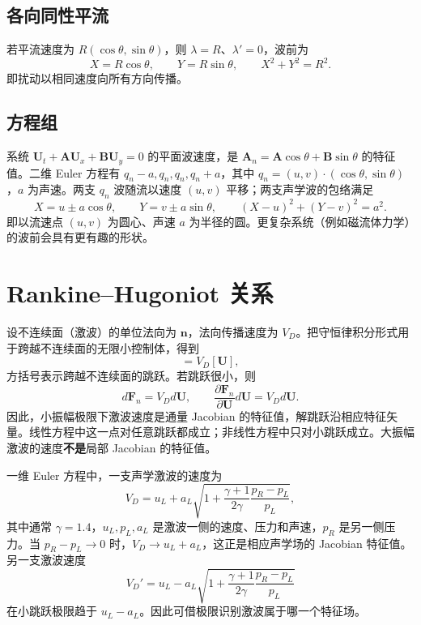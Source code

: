 \documentclass[11pt,a4paper,openany,fontset=none]{ctexbook}
\begin{document}
\subsection*{各向同性平流}
若平流速度为 $R(\cos\theta,\sin\theta)$，则 $\lambda=R$、$\lambda'=0$，波前为
\begin{equation}X=R\cos\theta,\qquad Y=R\sin\theta,\qquad X^2+Y^2=R^2. \tag{1.21.7--8}\end{equation}
即扰动以相同速度向所有方向传播。

\subsection*{方程组}
系统 $\bm U_t+\bm A\bm U_x+\bm B\bm U_y=0$ 的平面波速度，是 $\bm A_n=\bm A\cos\theta+\bm B\sin\theta$ 的特征值。二维 Euler 方程有 $q_n-a,q_n,q_n,q_n+a$，其中 $q_n=(u,v)\cdot(\cos\theta,\sin\theta)$，$a$ 为声速。两支 $q_n$ 波随流以速度 $(u,v)$ 平移；两支声学波的包络满足
\begin{equation}
 X=u\pm a\cos\theta,\qquad Y=v\pm a\sin\theta,\qquad
 (X-u)^2+(Y-v)^2=a^2. \tag{1.21.13--14}
\end{equation}
即以流速点 $(u,v)$ 为圆心、声速 $a$ 为半径的圆。更复杂系统（例如磁流体力学）的波前会具有更有趣的形状。

\section{Rankine--Hugoniot 关系}

设不连续面（激波）的单位法向为 $\bm n$，法向传播速度为 $V_D$。把守恒律积分形式用于跨越不连续面的无限小控制体，得到
\begin{equation}
 [\bm F_n]=V_D[\bm U], \tag{1.22.1}
\end{equation}
方括号表示跨越不连续面的跳跃。若跳跃很小，则
\begin{equation}
 d\bm F_n=V_Dd\bm U,\qquad
 \frac{\partial\bm F_n}{\partial\bm U}d\bm U=V_Dd\bm U. \tag{1.22.2--3}
\end{equation}
因此，小振幅极限下激波速度是通量 Jacobian 的特征值，解跳跃沿相应特征矢量。线性方程中这一点对任意跳跃都成立；非线性方程中只对小跳跃成立。大振幅激波的速度\textbf{不是}局部 Jacobian 的特征值。

一维 Euler 方程中，一支声学激波的速度为
\begin{equation}
 V_D=u_L+a_L\sqrt{1+\frac{\gamma+1}{2\gamma}\frac{p_R-p_L}{p_L}}, \tag{1.22.4}
\end{equation}
其中通常 $\gamma=1.4$，$u_L,p_L,a_L$ 是激波一侧的速度、压力和声速，$p_R$ 是另一侧压力。当 $p_R-p_L\to0$ 时，$V_D\to u_L+a_L$，这正是相应声学场的 Jacobian 特征值。另一支激波速度
\begin{equation}
 V_D'=u_L-a_L\sqrt{1+\frac{\gamma+1}{2\gamma}\frac{p_R-p_L}{p_L}} \tag{1.22.6}
\end{equation}
在小跳跃极限趋于 $u_L-a_L$。因此可借极限识别激波属于哪一个特征场。
\end{document}
